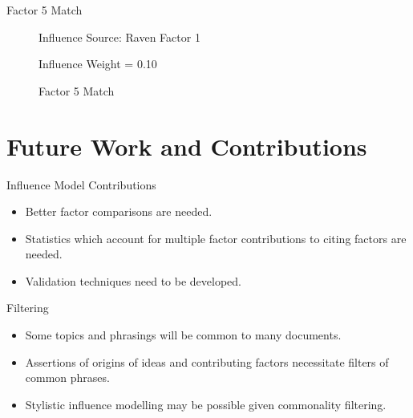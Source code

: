\documentclass[handout]{beamer}
\begin{document}
\begin{frame}{Factor 5 Match}
\begin{figure}%
    \centering
    \qquad
    \caption{Factor 5 Match}%
    \label{fig:com5}%
    Influence Source: Raven Factor 1 
    \par Influence Weight = 0.10
\end{figure}
\end{frame}


\section{Future Work and Contributions}
\begin{frame}{Influence Model Contributions}
    \begin{itemize}[<+->]
        \item Better factor comparisons are needed.
        \item Statistics which account for multiple factor contributions to citing factors are needed.
        \item Validation techniques need to be developed.
    \end{itemize}
\end{frame}

\begin{frame}{Filtering}
    \begin{itemize}[<+->]
        \item Some topics and phrasings will be common to many documents.
        \item Assertions of origins of ideas and contributing factors necessitate filters of common phrases.
        \item Stylistic influence modelling may be possible given commonality filtering.
    \end{itemize}
\end{frame}
\end{document}
